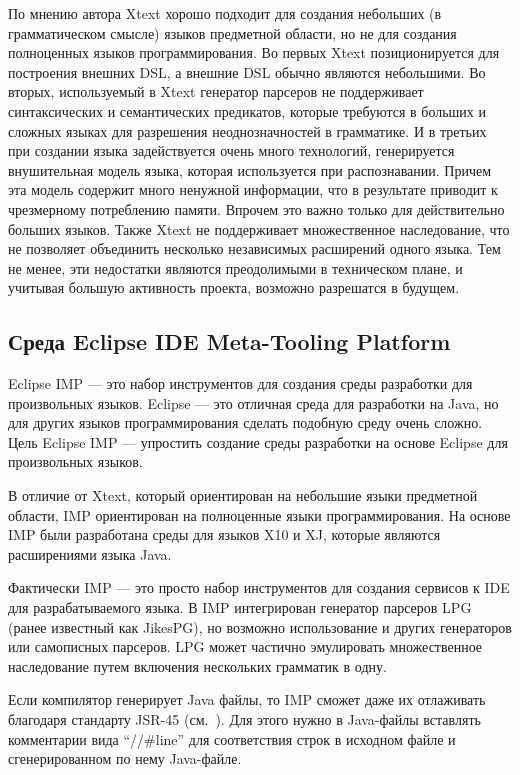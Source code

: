 \documentclass[a4paper,12pt,titlepage]{extarticle}
\begin{document}
По мнению автора Xtext хорошо подходит для создания небольших (в грамматическом
смысле) языков предметной области, но не для создания полноценных языков
программирования. Во первых Xtext позиционируется для построения внешних DSL, а внешние DSL обычно
являются небольшими. Во вторых, используемый в Xtext генератор парсеров не
поддерживает синтаксических и семантических предикатов, которые требуются в
больших и сложных языках для разрешения неоднозначностей в грамматике. И в
третьих при создании языка задействуется очень много технологий, генерируется
внушительная модель языка, которая используется при распознавании. Причем эта
модель содержит много ненужной информации, что в результате приводит к
чрезмерному потреблению памяти. Впрочем это важно только для действительно
больших языков.
Также Xtext не поддерживает множественное наследование, что не позволяет
объединить несколько независимых расширений одного языка.
Тем не менее, эти недостатки являются преодолимыми в техническом плане, и
учитывая большую активность проекта, возможно разрешатся в будущем.

\subsection{Среда Eclipse IDE Meta-Tooling Platform}
\label{imp}
Eclipse IMP --- это набор инструментов для создания среды разработки для
произвольных языков.
Eclipse --- это отличная среда для разработки на Java, но для
других языков программирования сделать подобную среду очень сложно. Цель
Eclipse IMP --- упростить создание среды разработки на основе Eclipse для
произвольных языков.

В отличие от Xtext, который ориентирован на небольшие языки предметной области,
IMP ориентирован на полноценные языки программирования. На основе IMP
были разработана среды для языков X10 и XJ, которые являются расширениями
языка Java.

Фактически IMP --- это просто набор инструментов для создания сервисов к IDE для
разрабатываемого языка. В IMP интегрирован генератор парсеров LPG (ранее
известный как JikesPG), но возможно использование и других генераторов или
самописных парсеров. LPG может частично эмулировать множественное наследование
путем включения нескольких грамматик в одну.

Если компилятор генерирует Java файлы, то IMP сможет даже их отлаживать
благодаря стандарту JSR-45 (см.~\cite{JSR45}). Для этого нужно в Java-файлы
вставлять комментарии вида ``//\#line'' для соответствия строк в исходном файле и
сгенерированном по нему Java-файле.
\end{document}
